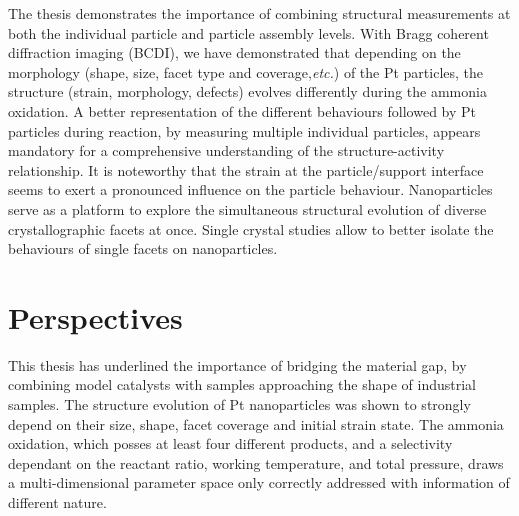 
The thesis demonstrates the importance of combining structural measurements at both the individual particle and particle assembly levels.
With Bragg coherent diffraction imaging (BCDI), we have demonstrated that depending on the morphology (shape, size, facet type and coverage,\textit{etc.}) of the Pt particles, the structure (strain, morphology, defects) evolves differently during the ammonia oxidation.
A better representation of the different behaviours followed by Pt particles during reaction, by measuring multiple individual particles, appears mandatory for a comprehensive understanding of the structure-activity relationship.
It is noteworthy that the strain at the particle/support interface seems to exert a pronounced influence on the particle behaviour.
Nanoparticles serve as a platform to explore the simultaneous structural evolution of diverse crystallographic facets at once.
Single crystal studies allow to better isolate the behaviours of single facets on nanoparticles.

\section{Perspectives}


This thesis has underlined the importance of bridging the material gap, by combining model catalysts with samples approaching the shape of industrial samples.
The structure evolution of Pt nanoparticles was shown to strongly depend on their size, shape, facet coverage and initial strain state.
The ammonia oxidation, which posses at least four different products, and a selectivity dependant on the reactant ratio, working temperature, and total pressure, draws a multi-dimensional parameter space only correctly addressed with information of different nature.

